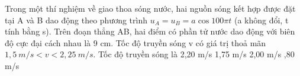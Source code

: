 \begin{vidu}%
Trong một thí nghiệm về giao thoa sóng nước, hai nguồn sóng kết hợp được đặt tại A và B dao động theo phương trình $u_A = u_B = a\cos100\pi t$ (a không đổi, t tính bằng s). Trên đoạn thẳng AB, hai điểm có phần tử nước dao động với biên độ cực đại cách nhau là 9 cm. Tốc độ truyền sóng v có giá trị thoả mãn $1,5\ m/s < v < 2,25\ m/s$. Tốc độ truyền sóng là
\choice
{2,20 m/s}
{1,75 m/s}
{2,00 m/s}
{,80 m/s}
\end{vidu} 


